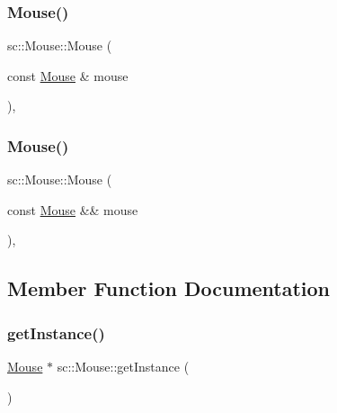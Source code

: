 \mbox{\label{classsc_1_1_mouse_a00f31e6c9784326aaa85a7b406c3a5e1}} 
\subsubsection{\texorpdfstring{Mouse()}{Mouse()}\hspace{0.1cm}{\footnotesize\ttfamily [2/3]}}
{\footnotesize\ttfamily sc\+::\+Mouse\+::\+Mouse (\begin{DoxyParamCaption}\item[{const \mbox{\hyperlink{classsc_1_1_mouse}{Mouse}} \&}]{mouse }\end{DoxyParamCaption})\hspace{0.3cm}{\ttfamily [private]}, {\ttfamily [delete]}}

\mbox{\label{classsc_1_1_mouse_a54a8b28933bcd108f09a92c51a50098a}} 
\subsubsection{\texorpdfstring{Mouse()}{Mouse()}\hspace{0.1cm}{\footnotesize\ttfamily [3/3]}}
{\footnotesize\ttfamily sc\+::\+Mouse\+::\+Mouse (\begin{DoxyParamCaption}\item[{const \mbox{\hyperlink{classsc_1_1_mouse}{Mouse}} \&\&}]{mouse }\end{DoxyParamCaption})\hspace{0.3cm}{\ttfamily [private]}, {\ttfamily [delete]}}



\subsection{Member Function Documentation}
\mbox{\label{classsc_1_1_mouse_ab5cf94940a8ab2dad32bf298abf69b2d}} 
\subsubsection{\texorpdfstring{getInstance()}{getInstance()}}
{\footnotesize\ttfamily \mbox{\hyperlink{classsc_1_1_mouse}{Mouse}} $\ast$ sc\+::\+Mouse\+::get\+Instance (\begin{DoxyParamCaption}{ }\end{DoxyParamCaption})\hspace{0.3cm}{\ttfamily [static]}}

